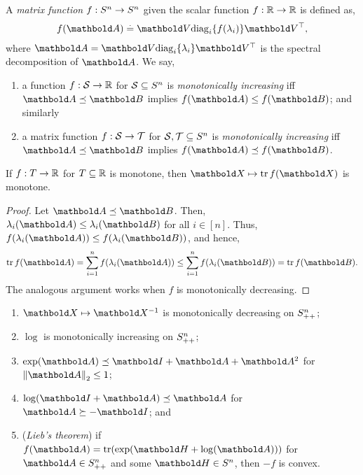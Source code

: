 \begin{defn} A \emph{matrix function} $f : S^n \to S^n$ given the scalar function $f : \mathbb{R} \to \mathbb{R}$ is defined as, \begin{align}
    f(\mA) \defeq \mV \diag_i\{f(\lambda_i)\} \trans{\mV},
\end{align} where $\mA = \mV\diag_i\{\lambda_i\}\trans{\mV}$ is the spectral decomposition of $\mA$. We say, \begin{enumerate}
    \item a function $f: \mathcal{S} \to \mathbb{R}$ for $\mathcal{S} \subseteq S^n$ is \emph{monotonically increasing} iff $\mA \preceq \mB$ implies $f(\mA) \leq f(\mB)$; and similarly
    \item a matrix function $f: \mathcal{S} \to \mathcal{T}$ for $\mathcal{S}, \mathcal{T} \subseteq S^n$ is \emph{monotonically increasing} iff $\mA \preceq \mB$ implies $f(\mA) \preceq f(\mB)$.
\end{enumerate}
\end{defn}
\begin{lem}
If $f : T \to \mathbb{R}$ for $T \subseteq \mathbb{R}$ is monotone, then $\mX \mapsto \tr{f(\mX)}$ is monotone.
\end{lem}
\begin{proof}
Let $\mA \preceq \mB$. Then, $\lambda_i(\mA) \leq \lambda_i(\mB)$ for all $i \in [n]$. Thus, $f(\lambda_i(\mA)) \leq f(\lambda_i(\mB))$, and hence, \begin{align*}
    \tr{f(\mA)} = \sum_{i=1}^n f(\lambda_i(\mA)) \leq \sum_{i=1}^n f(\lambda_i(\mB)) = \tr{f(\mB)}.
\end{align*} The analogous argument works when $f$ is monotonically decreasing.
\end{proof}

\begin{lem}
\leavevmode\begin{enumerate}
    \item $\mX \mapsto \inv{\mX}$ is monotonically decreasing on $S_{++}^n$;
    \item $\log$ is monotonically increasing on $S_{++}^n$;
    \item $\exp(\mA) \preceq \mI + \mA + \mA^2$ for $\norm{\mA}_2 \leq 1$;
    \item $\log(\mI + \mA) \preceq \mA$ for $\mA \succeq - \mI$; and
    \item (\emph{Lieb's theorem}) if $f(\mA) = \tr(\exp(\mH + \log(\mA)))$ for $\mA \in \sS_{++}^n$ and some $\mH \in \sS^n$, then $-f$ is convex.
\end{enumerate}
\end{lem}

